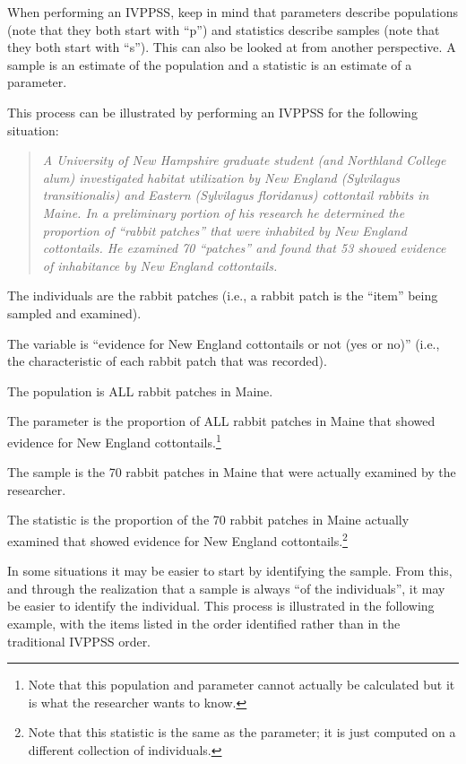 \documentclass[10pt,openany]{book}\usepackage[]{graphicx}\usepackage[]{color}
\begin{document}
When performing an IVPPSS, keep in mind that parameters describe populations (note that they both start with ``p'') and statistics describe samples (note that they both start with ``s'').  This can also be looked at from another perspective.  A sample is an estimate of the population and a statistic is an estimate of a parameter.

This process can be illustrated by performing an IVPPSS for the following situation:
\begin{quote}
\textit{A University of New Hampshire graduate student (and Northland College alum) investigated habitat utilization by New England (Sylvilagus transitionalis) and Eastern (Sylvilagus floridanus) cottontail rabbits in Maine.  In a preliminary portion of his research he determined the proportion of ``rabbit patches'' that were inhabited by New England cottontails.  He examined 70 ``patches'' and found that 53 showed evidence of inhabitance by New England cottontails.}
\end{quote}

\begin{Itemize}
  \item The individuals are the rabbit patches (i.e., a rabbit patch is the ``item'' being sampled and examined).
  \item The variable is ``evidence for New England cottontails or not (yes or no)'' (i.e., the characteristic of each rabbit patch that was recorded).
  \item The population is ALL rabbit patches in Maine.
  \item The parameter is the proportion of ALL rabbit patches in Maine that showed evidence for New England cottontails.\footnote{Note that this population and parameter cannot actually be calculated but it is what the researcher wants to know.}
  \item The sample is the 70 rabbit patches in Maine that were actually examined by the researcher.
  \item The statistic is the proportion of the 70 rabbit patches in Maine actually examined that showed evidence for New England cottontails.\footnote{Note that this statistic is the same as the parameter; it is just computed on a different collection of individuals.}
\end{Itemize}

In some situations it may be easier to start by identifying the sample.  From this, and through the realization that a sample is always ``of the individuals'', it may be easier to identify the individual.  This process is illustrated in the following example, with the items listed in the order identified rather than in the traditional IVPPSS order.
\end{document}
